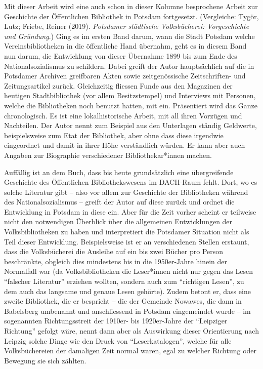 \documentclass[a4paper,
fontsize=11pt,
oneside,
numbers=noperiodatend,
parskip=half-,
bibliography=totoc,
final
]{scrartcl}
\begin{document}
Mit dieser Arbeit wird eine auch schon in dieser Kolumne besprochene
Arbeit zur Geschichte der Öffentlichen Bibliothek in Potsdam
fortgesetzt. (Vergleiche: Tygör, Lutz; Friebe, Reiner (2019).
\emph{Potsdamer städtische Volksbücherei: Vorgeschichte und Gründung}.)
Ging es im ersten Band darum, wann die Stadt Potsdam welche
Vereinsbibliotheken in die öffentliche Hand übernahm, geht es in diesem
Band nun darum, die Entwicklung von dieser Übernahme 1899 bis zum Ende
des Nationalsozialismus zu schildern. Dabei greift der Autor
hauptsächlich auf die in Potsdamer Archiven greifbaren Akten sowie
zeitgenössische Zeitschriften- und Zeitungsartikel zurück. Gleichzeitig
fliessen Funde aus den Magazinen der heutigen Stadtbibliothek (vor allem
Besitzstempel) und Interviews mit Personen, welche die Bibliotheken noch
benutzt hatten, mit ein. Präsentiert wird das Ganze chronologisch. Es
ist eine lokalhistorische Arbeit, mit all ihren Vorzügen und Nachteilen.
Der Autor nennt zum Beispiel aus den Unterlagen ständig Geldwerte,
beispielsweise zum Etat der Bibliothek, aber ohne dass diese irgendwie
eingeordnet und damit in ihrer Höhe verständlich würden. Er kann aber
auch Angaben zur Biographie verschiedener Bibliothekar*innen machen.

Auffällig ist an dem Buch, dass bis heute grundsätzlich eine
übergreifende Geschichte des Öffentlichen Bibliothekswesens im DACH-Raum
fehlt. Dort, wo es solche Literatur gibt -- also vor allem zur
Geschichte der Bibliotheken während des Nationalsozialismus -- greift
der Autor auf diese zurück und ordnet die Entwicklung in Potsdam in
diese ein. Aber für die Zeit vorher scheint er teilweise nicht den
notwendigen Überblick über die allgemeinen Entwicklungen der
Volksbibliotheken zu haben und interpretiert die Potsdamer Situation
nicht als Teil dieser Entwicklung. Beispielsweise ist er an
verschiedenen Stellen erstaunt, dass die Volksbücherei die Ausleihe auf
ein bis zwei Bücher pro Person beschränkte, obgleich dies mindestens bis
in die 1950er-Jahre hinein der Normalfall war (da Volksbibliotheken die
Leser*innen nicht nur gegen das Lesen \enquote{falscher Literatur}
erziehen wollten, sondern auch zum \enquote{richtigen Lesen}, zu dem
auch das langsame und genaue Lesen gehörte). Zudem betont er, dass eine
zweite Bibliothek, die er bespricht -- die der Gemeinde Nowawes, die
dann in Babelsberg umbenannt und anschliessend in Potsdam eingemeindet
wurde -- im sogenannten Richtungsstreit der 1910er- bis 1920er-Jahre der
\enquote{Leipziger Richtung} gefolgt wäre, nennt dann aber als
Auswirkung dieser Orientierung nach Leipzig solche Dinge wie den Druck
von \enquote{Leserkatalogen}, welche für alle Volksbüchereien der
damaligen Zeit normal waren, egal zu welcher Richtung oder Bewegung sie
sich zählten.
\end{document}
